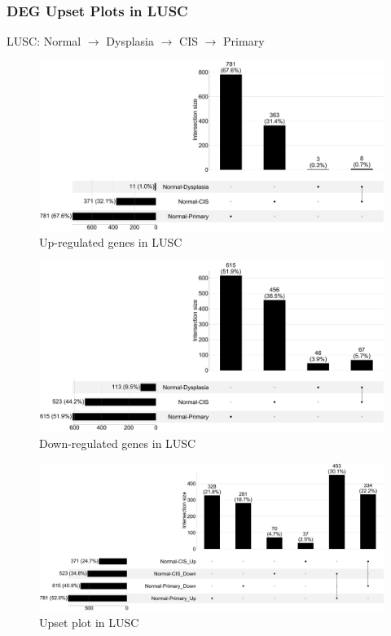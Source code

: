 \documentclass{beamer}
\begin{document}
    \begin{frame}[allowframebreaks]
        \frametitle{DEG Upset Plots in LUSC}
        LUSC: Normal $\rightarrow$ Dysplasia $\rightarrow$ CIS $\rightarrow$ Primary

        \begin{figure}
            \includegraphics[width=0.8 \linewidth]{figures/DEG/Pair-Venn/STAR.FPKM.SQC.Up.venn.pdf}
            \caption{Up-regulated genes in LUSC}
        \end{figure}

        \begin{figure}
            \includegraphics[width=0.8 \linewidth]{figures/DEG/Pair-Venn/STAR.FPKM.SQC.Down.venn.pdf}
            \caption{Down-regulated genes in LUSC}
        \end{figure}

        \begin{figure}
            \includegraphics[width=0.8 \linewidth]{figures/DEG/Pair-Venn/STAR.FPKM.SQC.venn.pdf}
            \caption{Upset plot in LUSC}
        \end{figure}
    \end{frame}
\end{document}
